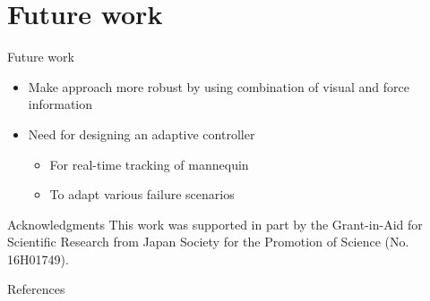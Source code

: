 \documentclass[aspectratio=43,11pt,xcolor={dvipsnames}]{beamer}
\begin{document}
\section{Future work}
\begin{frame}{Future work}
	\linespread{1.5}
		
	\begin{itemize}
		\item Make approach more robust by using combination of visual and force information
		\item Need for designing an adaptive controller
		      \begin{itemize}
		      	\item For real-time tracking of mannequin
		      	\item To adapt various failure scenarios
		      \end{itemize}
	\end{itemize}
			
	\begin{exampleblock}{Acknowledgments}
		This work was supported in part by the Grant-in-Aid for Scientific Research from Japan Society for the Promotion of Science (No. 16H01749).
	\end{exampleblock}
\end{frame}

\begin{frame}[noframenumbering]{References}
	\nocite{*}
	\hspace*{0.5cm}
	\begin{minipage}{\dimexpr\textwidth-1cm\relax}
		\printbibliography
	\end{minipage}
\end{frame}



\end{document}
